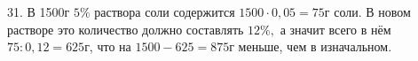 31. В 1500г $5\%$ раствора соли содержится $1500\cdot0,05=75$г соли. В новом растворе это количество должно составлять $12\%,$ а значит всего в нём $75:0,12=625$г, что на $1500-625=875$г меньше, чем в изначальном.\\
